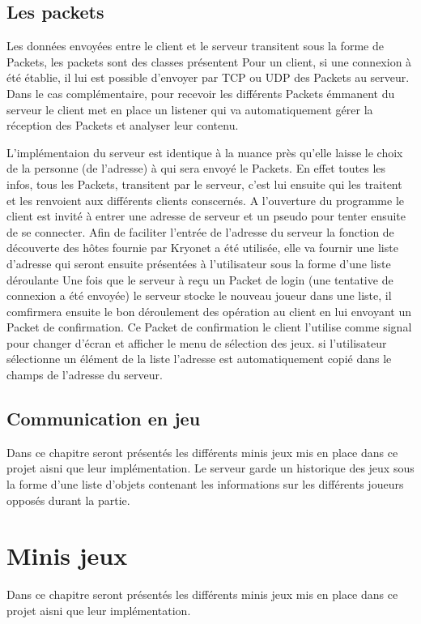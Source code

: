 \documentclass{report}
\begin{document}
\section{Les packets}
Les données envoyées entre le client et le serveur transitent sous la forme de Packets, les packets sont des classes présentent
Pour un client, si une connexion à été établie, il lui est possible d'envoyer par
TCP ou UDP des Packets au serveur. Dans le cas complémentaire,
pour recevoir les différents Packets émmanent du serveur le client met en place
un listener qui va automatiquement gérer la réception des Packets et analyser leur contenu.

L'implémentaion du serveur est identique à la nuance près qu'elle laisse le choix
de la personne (de l'adresse) à qui sera envoyé le Packets. En effet toutes les infos, tous les Packets,
transitent par le serveur, c'est lui ensuite qui les traitent et les renvoient aux différents clients conscernés.
A l'ouverture du programme le client est invité à entrer une adresse de serveur
et un pseudo pour tenter ensuite de se connecter. Afin de faciliter l'entrée de l'adresse du serveur la fonction de
découverte des hôtes fournie par Kryonet a été utilisée, elle va fournir une
liste d'adresse qui seront ensuite présentées à l'utilisateur sous la forme d'une liste déroulante
Une fois que le serveur à reçu un Packet de login (une tentative de connexion a
été envoyée) le serveur stocke le nouveau joueur dans une liste, il comfirmera ensuite le
bon déroulement des opération au client en lui envoyant un Packet de confirmation.
Ce Packet de confirmation le client l'utilise comme signal pour changer d'écran
et afficher le menu de sélection des jeux.
si l'utilisateur sélectionne un élément de la liste l'adresse est automatiquement copié dans le champs de l'adresse du serveur.


\section{Communication en jeu}
Dans ce chapitre seront présentés les différents minis jeux mis en place dans
ce projet aisni que leur implémentation.
Le serveur garde un historique des jeux sous la forme d'une liste d'objets
contenant les informations sur les différents joueurs opposés durant la partie.
\chapter{Minis jeux}
Dans ce chapitre seront présentés les différents minis jeux mis en place dans ce projet aisni que leur implémentation.
\end{document}
